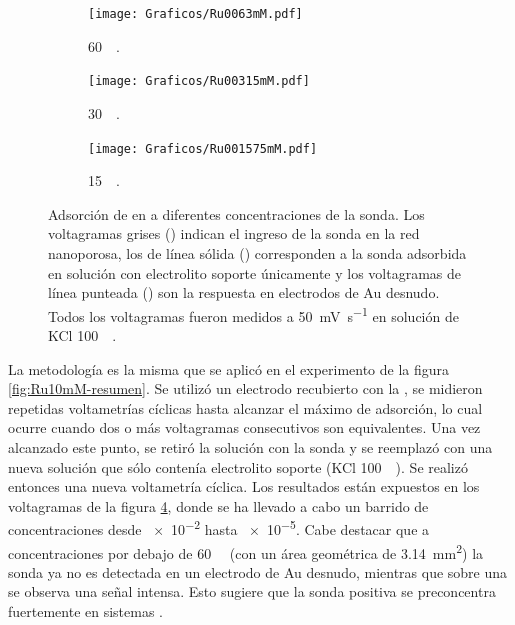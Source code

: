 \begin{figure}[b!]
\begin{subfigure}[t]{0.325\textwidth}
			        	\texttt{[image: Graficos/Ru0063mM.pdf]}
			       		\vspace*{-0.40cm}\caption{\aminorutenio\space \SI{60}{\micro\Molar}.}
			         	\label{fig:Ru0063mM}
			     		\end{subfigure}
		     		\begin{subfigure}[t]{0.325\textwidth}
			        	\texttt{[image: Graficos/Ru00315mM.pdf]}
			       		\vspace*{-0.40cm}\caption{\aminorutenio\space \SI{30}{\micro\Molar}.}
			         	\label{fig:Ru00315mM}
			     		\end{subfigure}
		     		\begin{subfigure}[t]{0.325\textwidth}
			        	\texttt{[image: Graficos/Ru001575mM.pdf]}
			       		\vspace*{-0.40cm}\caption{\aminorutenio\space \SI{15}{\micro\Molar}.}
			         	\label{fig:Ru001575mM}
			     		\end{subfigure}	
		 	   	   	\caption[Preconcentración de \aminorutenio\space en \pdmF]{Adsorción de \ru\space en \pdm\space a diferentes concentraciones de la sonda. Los voltagramas grises (\usebox{\gris}) indican el ingreso de la sonda en la red nanoporosa, los de línea sólida (\usebox{\negro}) corresponden a la sonda adsorbida en solución con electrolito soporte únicamente y los voltagramas de línea punteada (\usebox{\punteado}) son la respuesta en electrodos de Au desnudo. Todos los voltagramas fueron medidos a \SI{50}{\milli\volt\per\second} en solución de KCl \SI{100}{\milli\Molar}.}
		     		\label{fig:preconcentraciones}
		      	   	\end{figure} 

		La metodología es la misma que se aplicó en el experimento de la figura \ref{fig:Ru10mM-resumen}. Se utilizó un electrodo recubierto con la \pdmF, se midieron repetidas voltametrías cíclicas hasta alcanzar el máximo de adsorción, lo cual ocurre cuando dos o más voltagramas consecutivos son equivalentes. Una vez alcanzado este punto, se retiró la solución con la sonda y se reemplazó con una nueva solución que sólo contenía electrolito soporte (KCl \SI{100}{\milli\Molar}). Se realizó entonces una nueva voltametría cíclica. Los resultados están expuestos en los voltagramas de la figura \ref{fig:preconcentraciones}, donde se ha llevado a cabo un barrido de concentraciones desde \SI{e-2}{\Molar} hasta \SI{e-5}{\Molar}. Cabe destacar que a concentraciones por debajo de \SI{60}{\micro\Molar} (con un área geométrica de \SI{3.14}{\square\mm}) la sonda ya no es detectada en un electrodo de Au desnudo, mientras que sobre una \pdm\space se observa una señal intensa. Esto sugiere que la sonda positiva se preconcentra fuertemente en sistemas \pdmF.

